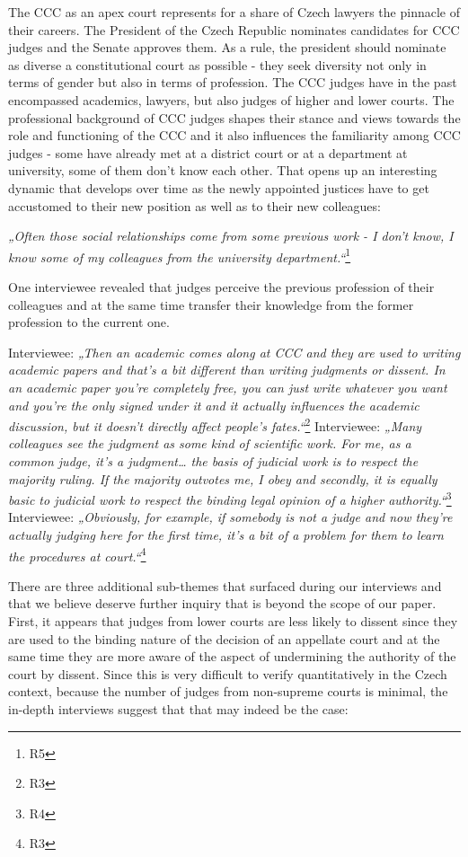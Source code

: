 \documentclass[
  11pt,
]{article}
\begin{document}
The CCC as an apex court represents for a share of Czech lawyers the pinnacle of their careers. The President of the Czech Republic nominates candidates for CCC judges and the Senate approves them. As a rule, the president should nominate as diverse a constitutional court as possible - they seek diversity not only in terms of gender but also in terms of profession. The CCC judges have in the past encompassed academics, lawyers, but also judges of higher and lower courts. The professional background of CCC judges shapes their stance and views towards the role and functioning of the CCC and it also influences the familiarity among CCC judges - some have already met at a district court or at a department at university, some of them don't know each other. That opens up an interesting dynamic that develops over time as the newly appointed justices have to get accustomed to their new position as well as to their new colleagues:

\emph{„Often those social relationships come from some previous work - I don't know, I know some of my colleagues from the university department.``}\footnote{R5}

One interviewee revealed that judges perceive the previous profession of their colleagues and at the same time transfer their knowledge from the former profession to the current one.

Interviewee: \emph{„Then an academic comes along at CCC and they are used to writing academic papers and that's a bit different than writing judgments or dissent. In an academic paper you're completely free, you can just write whatever you want and you're the only signed under it and it actually influences the academic discussion, but it doesn't directly affect people's fates.``}\footnote{R3}
Interviewee: \emph{„Many colleagues see the judgment as some kind of scientific work. For me, as a common judge, it's a judgment\ldots{} the basis of judicial work is to respect the majority ruling. If the majority outvotes me, I obey and secondly, it is equally basic to judicial work to respect the binding legal opinion of a higher authority.``}\footnote{R4}
Interviewee: \emph{„Obviously, for example, if somebody is not a judge and now they're actually judging here for the first time, it's a bit of a problem for them to learn the procedures at court.``}\footnote{R3}

There are three additional sub-themes that surfaced during our interviews and that we believe deserve further inquiry that is beyond the scope of our paper. First, it appears that judges from lower courts are less likely to dissent since they are used to the binding nature of the decision of an appellate court and at the same time they are more aware of the aspect of undermining the authority of the court by dissent. Since this is very difficult to verify quantitatively in the Czech context, because the number of judges from non-supreme courts is minimal, the in-depth interviews suggest that that may indeed be the case:
\end{document}

